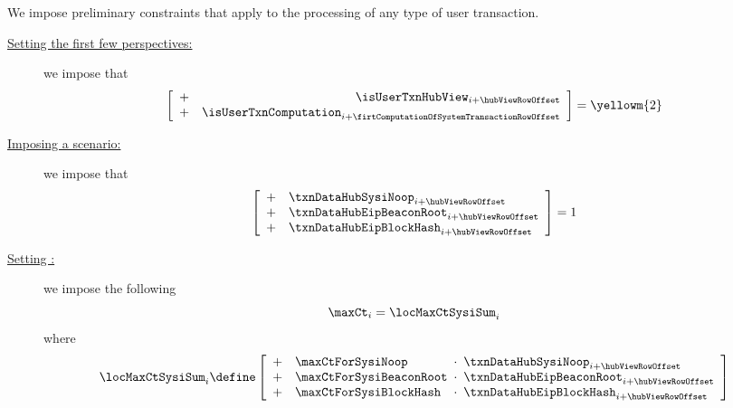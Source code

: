 \begin{center}
\end{center}
We impose preliminary constraints that apply to the processing of any type of user transaction.
\begin{description}
	\item[\underline{Setting the first few perspectives:}]
		we impose that
		\[
			\left[ \begin{array}{cr}
				+ & \isUserTxnHubView     _{i + \hubViewRowOffset                            } \\
				+ & \isUserTxnComputation _{i + \firtComputationOfSystemTransactionRowOffset } \\
			\end{array} \right]
			=
			\yellowm{2}
		\]
	\item[\underline{Imposing a scenario:}]
		we impose that
		\[
			\left[ \begin{array}{clcl}
				+ & \txnDataHubSysiNoop       _{i + \hubViewRowOffset} \\
				+ & \txnDataHubEipBeaconRoot  _{i + \hubViewRowOffset} \\
				+ & \txnDataHubEipBlockHash   _{i + \hubViewRowOffset} \\
			\end{array} \right]
			= 1
		\]
	\item[\underline{Setting \maxCt{}:}]
		we impose the following
		\[
			\maxCt _{i} = \locMaxCtSysiSum _{i}
		\]
		where
		\[
			\locMaxCtSysiSum _{i}
			\define
			\left[ \begin{array}{clcl}
				+ & \maxCtForSysiNoop       & \!\!\!\cdot\!\!\! & \txnDataHubSysiNoop       _{i + \hubViewRowOffset} \\
				+ & \maxCtForSysiBeaconRoot & \!\!\!\cdot\!\!\! & \txnDataHubEipBeaconRoot  _{i + \hubViewRowOffset} \\
				+ & \maxCtForSysiBlockHash  & \!\!\!\cdot\!\!\! & \txnDataHubEipBlockHash   _{i + \hubViewRowOffset} \\
			\end{array} \right]
		\]
\end{description}
